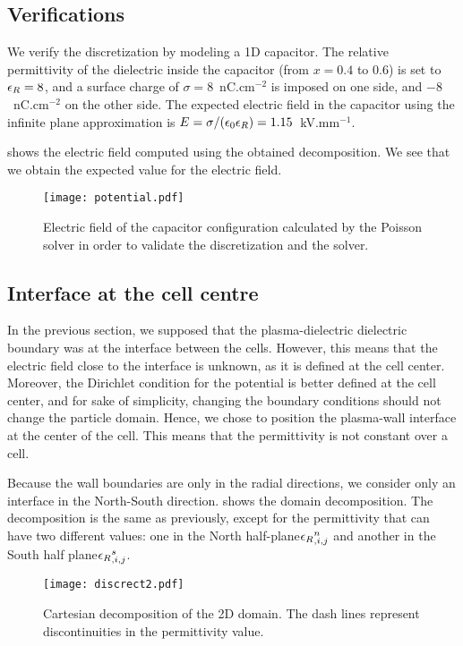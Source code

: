   \subsection{Verifications}
    We verify the discretization by modeling a \ac{1D} capacitor.
    The relative permittivity of the dielectric inside the capacitor (from $x=0.4$ to $0.6$) is set to $\epsilon_{R} = 8$, and a surface charge of  $\sigma = 8$~nC.cm$^{-2}$ is imposed on one side, and $-8$~nC.cm$^{-2}$ on the other side.
    The expected electric field in the capacitor using the infinite plane approximation is $E = \sigma/(\epsilon_0\epsilon_{R}) = 1.15$~kV.mm$^{-1}$.

     shows the electric field computed using the obtained decomposition.
    We see that we obtain the expected value for the electric field.

    \begin{figure}[hbtp]
      \label{fig-surface}
      \centering
      \texttt{[image: potential.pdf]}
      \caption{Electric field of the capacitor configuration calculated by the Poisson solver in order to validate the discretization and the solver. }
    \end{figure}


  \subsection{Interface at the cell centre}
    In the previous section, we supposed that the plasma-dielectric dielectric boundary was at the interface between the cells.
    However, this means that the electric field close to the interface is unknown, as it is defined at the cell center.
    Moreover, the Dirichlet condition for the potential is better defined at the cell center, and for sake of simplicity, changing the boundary conditions should not change the particle domain.
    Hence, we chose to position the plasma-wall interface at the center of the cell.
    This means that the permittivity is not constant over a cell.

    Because the wall boundaries are only in the radial directions, we consider only an interface in the North-South direction.
     shows the domain decomposition.
    The decomposition is the same as previously, except for the permittivity that can have two different values\string: one in the North half-plane${\epsilon_{R}}_{, i,j}^n$ and another in the South half plane${\epsilon_{R}}_{, i,j}^s$.

    \begin{figure}[hbt]
      \centering
      \texttt{[image: discrect2.pdf]}
      \caption{Cartesian decomposition of the \ac{2D} domain. The dash lines represent discontinuities in the permittivity value.}
      \label{fig-decompo2}
    \end{figure}

